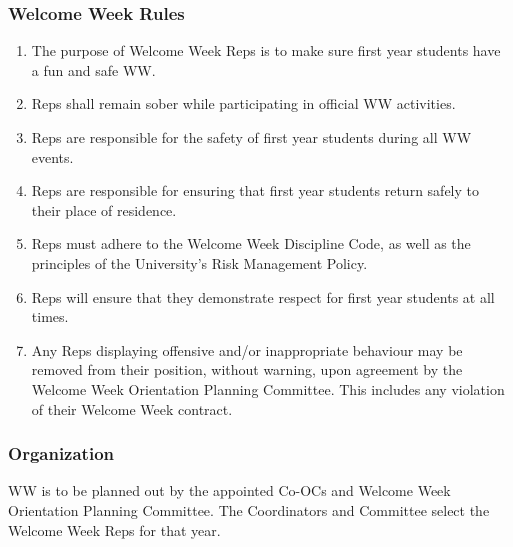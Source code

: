 \subsubsection{Welcome Week Rules}
\label{welcome-week-rules}
\begin{enumerate}
 \item
  The purpose of Welcome Week Reps is to make sure first year students have a fun and safe WW.
 \item
  Reps shall remain sober while participating in official WW activities.
 \item
  Reps are responsible for the safety of first year students during all WW events.
 \item
  Reps are responsible for ensuring that first year students return safely to their place of residence.
 \item
  Reps must adhere to the Welcome Week Discipline Code, as well as the principles of the University's Risk Management Policy.
 \item
  Reps will ensure that they demonstrate respect for first year students at all times.
 \item
  Any Reps displaying offensive and/or inappropriate behaviour may be removed from their position, without warning, upon agreement by the Welcome Week Orientation Planning Committee. This includes any violation of their Welcome Week contract.
\end{enumerate}

\subsubsection{Organization}
\label{organization}
WW is to be planned out by the appointed Co-OCs and Welcome Week
Orientation Planning Committee. The Coordinators and Committee select
the Welcome Week Reps for that year.

